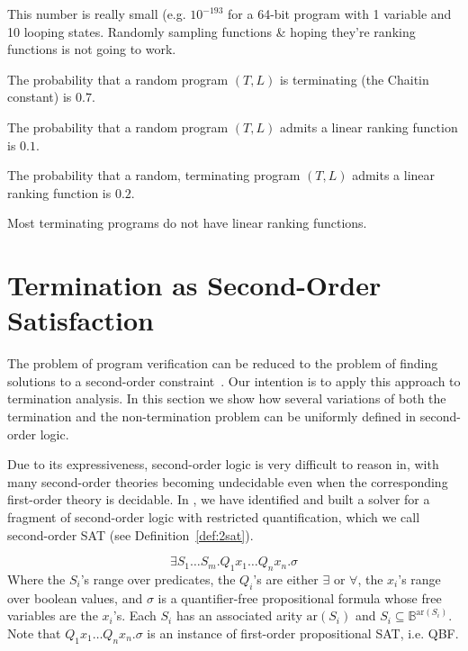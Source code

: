 \documentclass[a4paper]{llncs}
\begin{document}
\begin{corollary}
 This number is really small (e.g. $10^{-193}$ for a 64-bit program with 1 variable and 10 looping states.
 Randomly sampling functions \& hoping they're ranking functions is not going to work.
\end{corollary}


\begin{conjecture}
 The probability that a random program $(T, L)$ is terminating (the Chaitin constant)
 is $0.7$.
\end{conjecture}

\begin{conjecture}
 The probability that a random program $(T, L)$ admits a linear ranking function is
 $0.1$.
\end{conjecture}

\begin{conjecture}
 The probability that a random, terminating program $(T, L)$ admits a linear ranking function
 is $0.2$.
\end{conjecture}


\begin{corollary}
 Most terminating programs do not have linear ranking functions.
\end{corollary}
\fi


\section{Termination as Second-Order Satisfaction} \label{sec:second.order}


The problem of program verification can be reduced to the problem of finding
solutions to a second-order
constraint~\cite{DBLP:conf/pldi/GrebenshchikovLPR12,DBLP:conf/pldi/GulwaniSV08}. 
Our intention is to apply this approach to termination analysis.  In this
section we show how several variations of both the termination and the
non-termination problem can be uniformly defined in second-order logic.

Due to its expressiveness, second-order logic is very difficult to reason
in, with many second-order theories becoming undecidable even when the
corresponding first-order theory is decidable.
In \cite{kalashnikov}, we have identified and built a solver for a fragment of second-order logic with restricted quantification, 
which we call second-order SAT (see Definition~\ref{def:2sat}).

\begin{definition}
\label{def:2sat}
 \[
  \exists S_1 \ldots S_m . Q_1 x_1 \ldots Q_n x_n . \sigma
 \]
 Where the $S_i$'s range over predicates,
the $Q_i$'s are either $\exists$ or $\forall$,
the $x_i$'s range over boolean values,
 and $\sigma$ is a quantifier-free propositional formula
 whose free variables are the $x_i$'s.  
Each $S_i$ has an associated arity $\mathrm{ar}(S_i)$
 and $S_i \subseteq \mathbb{B}^{\mathrm{ar}(S_i)}$.  Note that 
$Q_1 x_1 \ldots Q_n x_n . \sigma$
 is an instance of first-order propositional SAT, i.e. QBF.
\end{definition}
\end{document}
